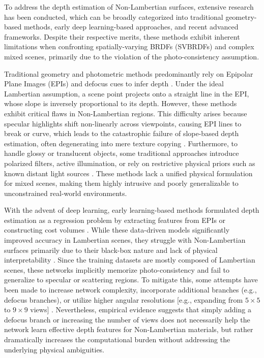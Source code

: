 To address the depth estimation of Non-Lambertian surfaces, extensive research has been conducted, which can be broadly categorized into traditional geometry-based methods, early deep learning-based approaches, and recent advanced frameworks. Despite their respective merits, these methods exhibit inherent limitations when confronting spatially-varying BRDFs (SVBRDFs) and complex mixed scenes, primarily due to the violation of the photo-consistency assumption.

Traditional geometry and photometric methods predominantly rely on Epipolar Plane Images (EPIs) and defocus cues to infer depth \cite{traditionalEPImethodsdefocu}. Under the ideal Lambertian assumption, a scene point projects onto a straight line in the EPI, whose slope is inversely proportional to its depth. However, these methods exhibit critical flaws in Non-Lambertian regions. This difficulty arises because specular highlights shift non-linearly across viewpoints, causing EPI lines to break or curve, which leads to the catastrophic failure of slope-based depth estimation, often degenerating into mere texture copying \cite{EPIfailuretexturecopying}. Furthermore, to handle glossy or translucent objects, some traditional approaches introduce polarized filters, active illumination, or rely on restrictive physical priors such as known distant light sources \cite{polarizedfiltersknownlight}. These methods lack a unified physical formulation for mixed scenes, making them highly intrusive and poorly generalizable to unconstrained real-world environments.

With the advent of deep learning, early learning-based methods formulated depth estimation as a regression problem by extracting features from EPIs or constructing cost volumes \cite{EPINetcostvolume}. While these data-driven models significantly improved accuracy in Lambertian scenes, they struggle with Non-Lambertian surfaces primarily due to their black-box nature and lack of physical interpretability \cite{lackofphysicalinterpretabil}. Since the training datasets are mostly composed of Lambertian scenes, these networks implicitly memorize photo-consistency and fail to generalize to specular or scattering regions. To mitigate this, some attempts have been made to increase network complexity, incorporate additional branches (e.g., defocus branches), or utilize higher angular resolutions  [e.g., expanding from $5 \times 5$ to $9 \times 9$ views] \cite{MaterialDualCueNethigherangu}. Nevertheless, empirical evidence suggests that simply adding a defocus branch or increasing the number of views does not necessarily help the network learn effective depth features for Non-Lambertian materials, but rather dramatically increases the computational burden without addressing the underlying physical ambiguities.

